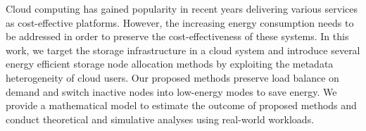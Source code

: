 Cloud computing has gained popularity in recent years delivering
various services as cost-effective platforms. However, the increasing
energy consumption needs to be addressed in order to preserve the
cost-effectiveness of these systems. In this work, we target the
storage infrastructure in a cloud system and introduce several energy
efficient storage node allocation methods by exploiting the metadata
heterogeneity of cloud users. Our proposed methods preserve load balance
on demand and switch inactive nodes into low-energy modes to save energy.
We provide a mathematical model to estimate the outcome of proposed methods
and conduct theoretical and simulative analyses using real-world workloads.
